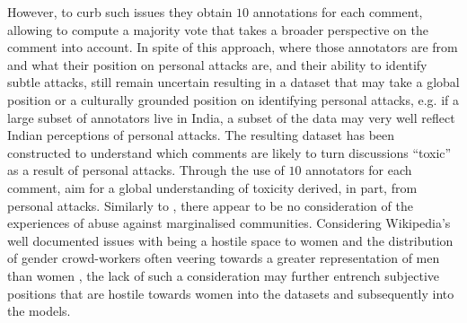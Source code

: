 However, to curb such issues they obtain $10$ annotations for each comment, allowing to compute a majority vote that takes a broader perspective on the comment into account.
In spite of this approach, where those annotators are from and what their position on personal attacks are, and their ability to identify subtle attacks, still remain uncertain resulting in a dataset that may take a global position or a culturally grounded position on identifying personal attacks, e.g. if a large subset of annotators live in India, a subset of the data may very well reflect Indian perceptions of personal attacks.
The resulting dataset has been constructed to understand which comments are likely to turn discussions ``toxic'' as a result of personal attacks. 
Through the use of $10$ annotators for each comment, \citet{Wulczyn:2017} aim for a global understanding of toxicity derived, in part, from personal attacks.
Similarly to \citet{Davidson:2017}, there appear to be no consideration of the experiences of abuse against marginalised communities.
Considering Wikipedia's well documented issues with being a hostile space to women \citep{Torres:2016} and the distribution of gender crowd-workers often veering towards a greater representation of men than women \citep{Posch:2018}, the lack of such a consideration may further entrench subjective positions that are hostile towards women into the datasets and subsequently into the models.

